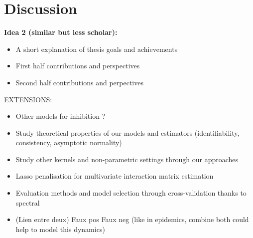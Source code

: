 \leadchapter{
}

\chapter{Discussion}


\textbf{Idea 2 (similar but less scholar):}
\begin{itemize}
    \item A short explanation of thesis goals and achievements
    \item First half contributions and perspectives
    \item Second half contributions and perpectives
\end{itemize}




EXTENSIONS:
\begin{itemize}
    \item Other models for inhibition ? %
    \item Study theoretical properties of our models and estimators (identifiability, consistency, asymptotic normality)
    
    \item Study other kernels and non-parametric settings through our approaches
    
    \item Lasso penalisation for multivariate interaction matrix estimation
    \item Evaluation methods and model selection through cross-validation thanks to spectral 
    
    \item (Lien entre deux) Faux pos Faux neg (like in epidemics, combine both could help to model this dynamics)
\end{itemize}